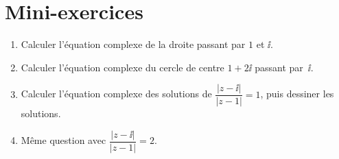 \begin{frame}
\end{frame}



\section*{Mini-exercices}

\begin{frame}
\begin{miniexercice}
\begin{enumerate}
  \item Calculer l'équation complexe de la droite passant par $1$ et $\ii$.
  \item Calculer l'équation complexe du cercle de centre $1+2\ii$ passant par~$\ii$.
  \item Calculer l'équation complexe des solutions de $\dfrac{|z-\ii|}{|z-1|}=1$, puis dessiner les solutions.
  \item Même question avec $\dfrac{|z-\ii|}{|z-1|}=2$.
\end{enumerate}
\end{miniexercice}

\end{frame}


